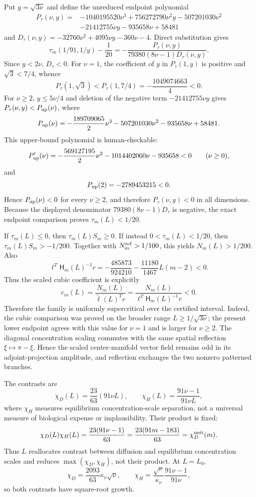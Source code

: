 \documentclass[10pt]{article}
\newcommand{\1}{\mathbf1}
\begin{document}
Put $y=\sqrt{3\nu}$ and define the unreduced endpoint polynomial
\begin{align*}
 P_\tau(\nu,y)={}&-1040195520\nu^3+756272790\nu^2y
 -507201030\nu^2\\
 &-21412755\nu y-935658\nu+58481
\end{align*}
and $D_\tau(\nu,y)=-32760\nu^2+4095\nu y-360\nu-4$.  Direct
substitution gives
\[
 \tau_m(1/91,1/y)-\frac1{20}
 =-\frac{P_\tau(\nu,y)}{79380(8\nu-1)D_\tau(\nu,y)}.
\]
Since $y<2\nu$, $D_\tau<0$.  For $\nu=1$, the coefficient of $y$ in
$P_\tau(1,y)$ is positive and $\sqrt3<7/4$, whence
\[
 P_\tau(1,\sqrt3)<P_\tau(1,7/4)=-\frac{1049074663}{4}<0.
\]
For $\nu\ge2$, $y\le5\nu/4$ and deletion of the negative term
$-21412755\nu y$ gives $P_\tau(\nu,y)<P_{\rm up}(\nu)$, where
\[
 P_{\rm up}(\nu)=-\frac{189709065}{2}\nu^3-507201030\nu^2
 -935658\nu+58481.
\]
This upper-bound polynomial is human-checkable:
\[
 P_{\rm up}'(\nu)=-\frac{569127195}{2}\nu^2-1014402060\nu-935658<0
 \qquad(\nu\ge0),
\]
and
\[
 P_{\rm up}(2)=-2789453215<0.
\]
Hence $P_{\rm up}(\nu)<0$ for every $\nu\ge2$, and therefore
$P_\tau(\nu,y)<0$ in all dimensions.  Because the displayed denominator
$79380(8\nu-1)D_\tau$ is negative, the exact endpoint comparison proves
$\tau_m(L)<1/20$.

If $\tau_m(L)\le0$, then $\tau_m(L)S_m\ge0$.  If instead
$0<\tau_m(L)<1/20$, then $\tau_m(L)S_m>-1/200$.  Together with
$N_m^{\rm ref}>1/100$, this yields $N_m(L)>1/200$.  Also
\[
 \ell^T\mathsf H_m(L)^{-1}r=-\frac{485873}{924210}
 -\frac{11180}{1467}L(m-2)<0.
\]
Thus the scaled cubic coefficient is explicitly
\[
 c_m(L)=\frac{N_m(L)}{\widetilde\ell(L)^Tr}
 =\frac{N_m(L)}{\ell^T\mathsf H_m(L)^{-1}r}<0.
\]
Therefore the family is uniformly supercritical over the certified interval.
Indeed, the cubic comparison was proved on the broader range
$L\ge1/\sqrt{3\nu}$; the present lower endpoint agrees with this value for
$\nu=1$ and is larger for $\nu\ge2$.
The diagonal concentration scaling commutes with the same spatial reflection
$\xi\mapsto\pi-\xi$.  Hence the scaled center-manifold vector field remains
odd in its adjoint-projection amplitude, and reflection exchanges the two
nonzero patterned branches.

The contrasts are
\[
 \chi_D(L)=\frac{23}{63}(91\nu L),\qquad
 \chi_H(L)=\frac{91\nu-1}{91\nu L},
\]
where $\chi_H$ measures equilibrium concentration-scale separation, not a
universal measure of biological expense or implausibility.  Their product is
fixed:
\[
 \chi_D(L)\chi_H(L)=\frac{23(91\nu-1)}{63}
 =\frac{23(91m-183)}{63}=\chi_D^{\rm unit}(m).
\]
Thus $L$ reallocates contrast between diffusion and equilibrium concentration
scales and reduces $\max(\chi_D,\chi_H)$, not their product.  At $L=L_0$,
\[
 \chi_D=\frac{2093}{63}\kappa_\nu\sqrt\nu,
 \qquad
 \chi_H=\frac{\sqrt\nu}{\kappa_\nu}\frac{91\nu-1}{91\nu},
\]
so both contrasts have square-root growth.
\end{document}
